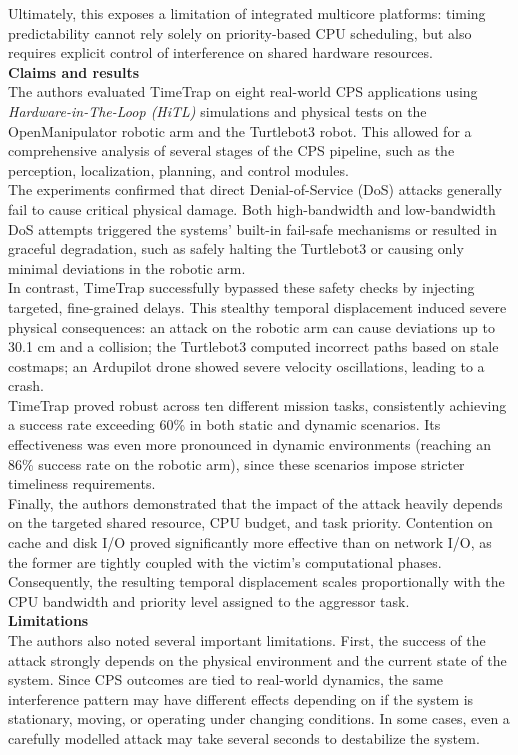 Ultimately, this exposes a limitation of integrated multicore platforms: timing predictability cannot rely solely on priority-based CPU scheduling, but also requires explicit control of interference on shared hardware resources.
\\
\textbf{Claims and results} 
\\
The authors evaluated TimeTrap on eight real-world CPS applications using \textit{Hardware-in-The-Loop (HiTL)} simulations and physical tests on the OpenManipulator robotic arm and the Turtlebot3 robot. This allowed for a comprehensive analysis of several stages of the CPS pipeline, such as the perception, localization, planning, and control modules.
\\
The experiments confirmed that direct Denial-of-Service (DoS) attacks generally fail to cause critical physical damage. Both high-bandwidth and low-bandwidth DoS attempts triggered the systems' built-in fail-safe mechanisms or resulted in graceful degradation, such as safely halting the Turtlebot3 or causing only minimal deviations in the robotic arm.
\\
In contrast, TimeTrap successfully bypassed these safety checks by injecting targeted, fine-grained delays. This stealthy temporal displacement induced severe physical consequences: an attack on the robotic arm can cause deviations up to 30.1 cm and a collision; the Turtlebot3 computed incorrect paths based on stale costmaps; an Ardupilot drone showed severe velocity oscillations, leading to a crash.
\\
TimeTrap proved robust across ten different mission tasks, consistently achieving a success rate exceeding 60\% in both static and dynamic scenarios. Its effectiveness was even more pronounced in dynamic environments (reaching an 86\% success rate on the robotic arm), since these scenarios impose stricter timeliness requirements.
\\
Finally, the authors demonstrated that the impact of the attack heavily depends on the targeted shared resource, CPU budget, and task priority. Contention on cache and disk I/O proved significantly more effective than on network I/O, as the former are tightly coupled with the victim's computational phases. Consequently, the resulting temporal displacement scales proportionally with the CPU bandwidth and priority level assigned to the aggressor task.
\\
\textbf{Limitations}\\
The authors also noted several important limitations. First, the success of the attack strongly depends on the physical environment and the current state of the system. Since CPS outcomes are tied to real-world dynamics, the same interference pattern may have different effects depending on if the system is stationary, moving, or operating under changing conditions. In some cases, even a carefully modelled attack may take several seconds to destabilize the system.
